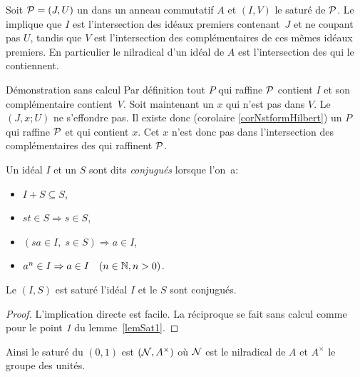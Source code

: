 \begin{corollary} 
\label{corNstfH2} 
Soit ${\cal P}=(J,U)$  un \proi dans un anneau commutatif $A$ et
 $(I,V)$ le saturé de ${\cal P}$. Le \tcg implique que $I$ est l'intersection 
des idéaux premiers contenant~$J$ et ne coupant pas $U$,
tandis que $V$ est l'intersection des complémentaires de ces mêmes 
idéaux premiers. En particulier le nilradical d'un idéal de $A$ est l'intersection des \ideps qui le contiennent.
\end{corollary}
%
\begin{Proof}{Démonstration sans calcul}
Par définition tout \idep $P$ qui raffine ${\cal P}$ contient $I$ et son complémentaire contient~$V$. Soit maintenant un $x$ qui n'est pas dans $V$.
Le \proi $(J,x;U)$ ne s'effondre pas. Il existe donc (corolaire \ref{corNstformHilbert}) un \idep $P$ qui raffine ${\cal P}$ et qui contient $x$. Cet $x$ n'est donc pas dans l'intersection des complémentaires des \ideps qui raffinent ${\cal P}$.    
\end{Proof}
%

\begin{propdef}  
\label{defConjug}
Un idéal $I$  et un \mo $S$ sont dits {\em conjugués} lorsque \hbox{l'on a}:
\begin{itemize}
%
\item  $I+S\subseteq S$,
%
\item   $s  t\in S     \Rightarrow  s \in S$,
%
\item $(s a\in I, \; s\in S)   \Rightarrow  a\in I$,
%
\item   $a^n\in I       \Rightarrow  a\in I  \quad (n\in\mathbb{N},n>0)$. 
%
\end{itemize}
Le \proi $(I,S)$ est saturé \ssi l'idéal $I$ et le \mo $S$ sont conjugués.
\end{propdef}



\begin{proof}L'implication directe est facile. La réciproque se fait sans calcul comme pour le point \emph{1} du lemme~\ref{lemSat1}.
\end{proof}
Ainsi le saturé du \proi $(0,1)$ est $({\cal N},A^{\times })$ où ${\cal N}$ est le 
nilradical de $A$ et $A^{\times}$ le groupe des unités.


